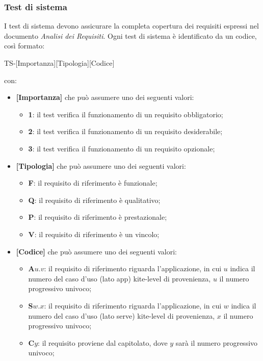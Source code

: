 \subsubsection{Test di sistema}
I test di sistema devono assicurare la completa copertura dei requisiti espressi nel documento \textit{Analisi dei Requisiti}.
Ogni test di sistema è identificato da un codice, così formato:
\begin{center}
    TS-[Importanza][Tipologia][Codice]
\end{center}
con:
\begin{itemize}
    \item \textbf{[Importanza]} che può assumere uno dei seguenti valori:
    \begin{itemize}
        \item \textbf{1}: il test verifica il funzionamento di un requisito obbligatorio;
        \item \textbf{2}: il test verifica il funzionamento di un requisito desiderabile;
        \item \textbf{3}: il test verifica il funzionamento di un requisito opzionale;
    \end{itemize}
    \item \textbf{[Tipologia]} che può assumere uno dei seguenti valori:
    \begin{itemize}
        \item \textbf{F}: il requisito di riferimento è funzionale;
        \item \textbf{Q}: il requisito di riferimento è qualitativo;
        \item \textbf{P}: il requisito di riferimento è prestazionale;
        \item \textbf{V}: il requisito di riferimento è un vincolo;
    \end{itemize}
    \item \textbf{[Codice]} che può assumere uno dei seguenti valori:
    \begin{itemize}
        \item \textbf{A}$u.v$: il requisito di riferimento riguarda l'applicazione, in cui $u$ indica il numero del caso d'uso (lato app) kite-level di provenienza, $u$ il numero progressivo univoco;
        \item \textbf{S}$w.x$: il requisito di riferimento riguarda l'applicazione, in cui $w$ indica il numero del caso d'uso (lato serve) kite-level di provenienza, $x$ il numero progressivo univoco;
        \item \textbf{C}$y$: il requisito proviene dal capitolato, dove $y$ sarà il numero progressivo univoco;

\end{itemize}
\end{itemize}
